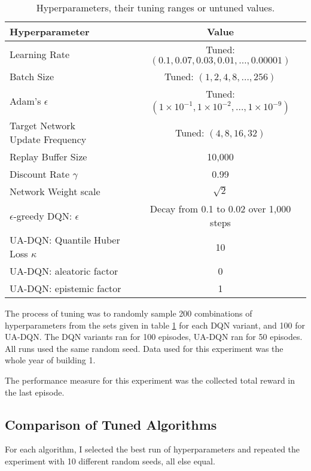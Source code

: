 \begin{table}
    \centering
    \caption{Hyperparameters, their tuning ranges or untuned values.}
    \label{tab:tuning}
    \begin{tabular}{l|c}
        Hyperparameter & Value \\ \hline
        Learning Rate  & Tuned:  $(0.1, 0.07, 0.03, 0.01, \dots, 0.00001)$                               \\
        Batch Size     & Tuned: $(1,2,4,8,\dots ,256)$                             \\
        Adam's $\epsilon$ & Tuned: $(1\times 10^{-1}, 1\times 10^{-2}, \dots, 1\times 10^{-9})$                           \\
        \makecell[l]{Target Network \\ Update Frequency} & Tuned: $(4, 8, 16, 32)$ \\ \hline
        Replay Buffer Size & 10,000 \\
        Discount Rate $\gamma$ & 0.99 \\ %
        Network Weight scale & $\sqrt{2}$ \\
        $\epsilon$-greedy DQN: $\epsilon$ & Decay from 0.1 to 0.02 over 1,000 steps \\
        UA-DQN: Quantile Huber Loss $\kappa$ & 10 \\
        UA-DQN: aleatoric factor & 0 \\
        UA-DQN: epistemic factor & 1 \\
    \end{tabular}
\end{table}

The process of tuning was to randomly sample 200 combinations of hyperparameters from the sets given in table \ref{tab:tuning} for each DQN variant, and 100 for UA-DQN.
The DQN variants ran for 100 episodes, UA-DQN ran for 50 episodes.
All runs used the same random seed.
Data used for this experiment was the whole year of building 1.

The performance measure for this experiment was the collected total reward in the last episode.

\subsection{Comparison of Tuned Algorithms}
For each algorithm, I selected the best run of hyperparameters and repeated the experiment with 10 different random seeds, all else equal.


